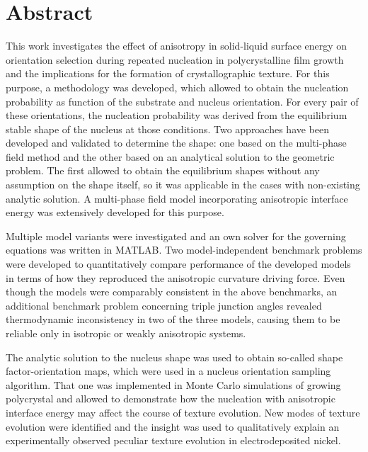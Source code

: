 \chapter{Abstract}                                 \label{ch:abstract}
This work investigates the effect of anisotropy in solid-liquid surface energy on orientation selection during repeated nucleation in polycrystalline film growth and the implications for the formation of crystallographic texture. For this purpose, a methodology was developed, which allowed to obtain the nucleation probability as function of the substrate and nucleus orientation. For every pair of these orientations, the nucleation probability was derived from the equilibrium stable shape of the nucleus at those conditions. Two approaches have been developed and validated to determine the shape: one based on the multi-phase field method and the other based on an analytical solution to the geometric problem. The first allowed to obtain the equilibrium shapes without any assumption on the shape itself, so it was applicable in the cases with non-existing analytic solution. A multi-phase field model incorporating anisotropic interface energy was extensively developed for this purpose.

Multiple model variants were investigated and an own solver for the governing equations was written in MATLAB. Two model-independent benchmark problems were developed to quantitatively compare performance of the developed models in terms of how they reproduced the anisotropic curvature driving force. Even though the models were comparably consistent in the above benchmarks, an additional benchmark problem concerning triple junction angles revealed thermodynamic inconsistency in two of the three models, causing them to be reliable only in isotropic or weakly anisotropic systems.

The analytic solution to the nucleus shape was used to obtain so-called shape factor-orientation maps, which were used in a nucleus orientation sampling algorithm. That one was implemented in Monte Carlo simulations of growing polycrystal and allowed to demonstrate how the nucleation with anisotropic interface energy may affect the course of texture evolution. New modes of texture evolution were identified and the insight was used to qualitatively explain an experimentally observed peculiar texture evolution in electrodeposited nickel. 


